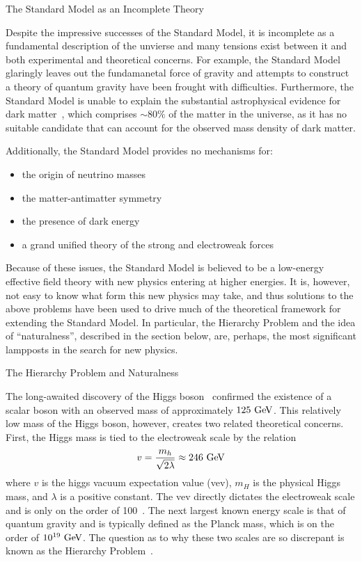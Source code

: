 \begin{section}{The Standard Model as an Incomplete Theory}

Despite the impressive successes of the Standard Model, it is incomplete as a fundamental description of the unvierse and many tensions exist between it and both experimental and theoretical concerns.
For example, the Standard Model glaringly leaves out the fundamanetal force of gravity and attempts to construct a theory of quantum gravity have been frought with difficulties.
Furthermore, the Standard Model is unable to explain the substantial astrophysical evidence for dark matter~\cite{Bertone:2004pz,Rubin:1970zza}, which comprises $\sim 80\%$ of the matter in the universe, as it has no suitable candidate that can account for the observed mass density of dark matter.

Additionally, the Standard Model provides no mechanisms for:
\begin{itemize}
\item the origin of neutrino masses
\item the matter-antimatter symmetry
\item the presence of dark energy
\item a grand unified theory of the strong and electroweak forces
\end{itemize}

Because of these issues, the Standard Model is believed to be a low-energy effective field theory with new physics entering at higher energies.
It is, however, not easy to know what form this new physics may take, and thus solutions to the above problems have been used to drive much of the theoretical framework for extending the Standard Model.
In particular, the Hierarchy Problem and the idea of ``naturalness'', described in the section below, are, perhaps, the most significant lampposts in the search for new physics.

\begin{subsection}{The Hierarchy Problem and Naturalness}

The long-awaited discovery of the Higgs boson~\cite{Aad:2012tfa,Chatrchyan:2012xdj,Chatrchyan:2013lba,Khachatryan:2014jba,Aad:2014aba,Aad:2015zhl} confirmed the existence of a scalar boson with an observed mass of approximately $125~\mathrm{Ge\kern -0.1em V}$.
This relatively low mass of the Higgs boson, however, creates two related theoretical concerns.
First, the Higgs mass is tied to the electroweak scale by the relation 
\begin{align}
v = \frac{m_{h}}{\sqrt{2\lambda}} \approx 246~\mathrm{Ge\kern -0.1em V}
\end{align}
where $v$ is the higgs vacuum expectation value (vev), $m_H$ is the physical Higgs mass, and $\lambda$ is a positive constant.
The vev directly dictates the electroweak scale and is only on the order of 100~\GeV.
The next largest known energy scale is that of quantum gravity and is typically defined as the Planck mass, which is on the order of $10^{19}~\mathrm{Ge\kern -0.1em V}$.
The question as to why these two scales are so discrepant is known as the Hierarchy Problem~\cite{Barbieri:1987fn}.


\end{subsection}
\end{section}

